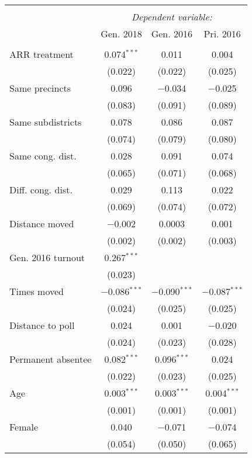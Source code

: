 
\begin{tabular}{@{\extracolsep{5pt}}lccc} 
\\[-1.8ex]\hline 
\hline \\[-1.8ex] 
 & \multicolumn{3}{c}{\textit{Dependent variable:}} \\ 
\cline{2-4} 
 & Gen. 2018 & Gen. 2016 & Pri. 2016 \\ 
\hline \\[-1.8ex] 
 ARR treatment & 0.074$^{***}$ & 0.011 & 0.004 \\ 
  & (0.022) & (0.022) & (0.025) \\ 
  Same precincts & 0.096 & $-$0.034 & $-$0.025 \\ 
  & (0.083) & (0.091) & (0.089) \\ 
  Same subdistricts & 0.078 & 0.086 & 0.087 \\ 
  & (0.074) & (0.079) & (0.080) \\ 
  Same cong. dist. & 0.028 & 0.091 & 0.074 \\ 
  & (0.065) & (0.071) & (0.068) \\ 
  Diff. cong. dist. & 0.029 & 0.113 & 0.022 \\ 
  & (0.069) & (0.074) & (0.072) \\ 
  Distance moved & $-$0.002 & 0.0003 & 0.001 \\ 
  & (0.002) & (0.002) & (0.003) \\ 
  Gen. 2016 turnout & 0.267$^{***}$ &  &  \\ 
  & (0.023) &  &  \\ 
  Times moved & $-$0.086$^{***}$ & $-$0.090$^{***}$ & $-$0.087$^{***}$ \\ 
  & (0.024) & (0.025) & (0.025) \\ 
  Distance to poll & 0.024 & 0.001 & $-$0.020 \\ 
  & (0.024) & (0.023) & (0.028) \\ 
  Permanent absentee & 0.082$^{***}$ & 0.096$^{***}$ & 0.024 \\ 
  & (0.022) & (0.023) & (0.025) \\ 
  Age & 0.003$^{***}$ & 0.003$^{***}$ & 0.004$^{***}$ \\ 
  & (0.001) & (0.001) & (0.001) \\ 
  Female & 0.040 & $-$0.071 & $-$0.074 \\ 
  & (0.054) & (0.050) & (0.065) \\ 

\end{tabular}
